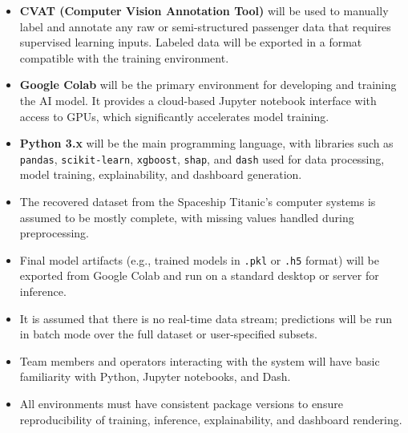 \documentclass[15pt]{article}
\begin{document}
\begin{itemize}
    \item \textbf{CVAT (Computer Vision Annotation Tool)} will be used to manually label and annotate any raw or semi-structured passenger data that requires supervised learning inputs. Labeled data will be exported in a format compatible with the training environment.
    
    \item \textbf{Google Colab} will be the primary environment for developing and training the AI model. It provides a cloud-based Jupyter notebook interface with access to GPUs, which significantly accelerates model training.
    
    \item \textbf{Python 3.x} will be the main programming language, with libraries such as \texttt{pandas}, \texttt{scikit-learn}, \texttt{xgboost}, \texttt{shap}, and \texttt{dash} used for data processing, model training, explainability, and dashboard generation.
    
    \item The recovered dataset from the Spaceship Titanic's computer systems is assumed to be mostly complete, with missing values handled during preprocessing.
    
    \item Final model artifacts (e.g., trained models in \texttt{.pkl} or \texttt{.h5} format) will be exported from Google Colab and run on a standard desktop or server for inference.
    
    \item It is assumed that there is no real-time data stream; predictions will be run in batch mode over the full dataset or user-specified subsets.
    
    \item Team members and operators interacting with the system will have basic familiarity with Python, Jupyter notebooks, and Dash.
    
    \item All environments must have consistent package versions to ensure reproducibility of training, inference, explainability, and dashboard rendering.
\end{itemize}
\end{document}
